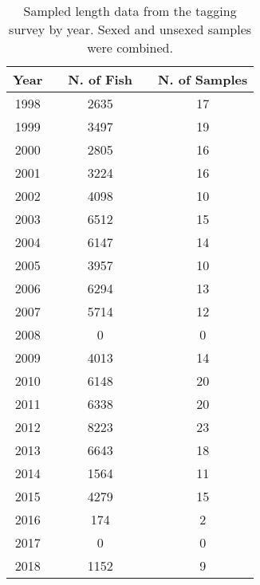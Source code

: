 \begingroup\fontsize{10}{12}\selectfont
\begingroup\fontsize{10}{12}\selectfont


\begin{table}[]
\caption{Sampled length data from the tagging survey by year. Sexed and unsexed samples were combined.}
\label{tab:survey_sample_indices}
\begin{tabular}{ccccc}
\hline
\multicolumn{1}{l}{Year} & \multicolumn{1}{l}{} & \multicolumn{1}{l}{N. of Fish} & \multicolumn{1}{l}{} & \multicolumn{1}{l}{N. of Samples} \\ \hline
1998 &  & 2635 &  & 17 \\
1999 &  & 3497 &  & 19 \\
2000 &  & 2805 &  & 16 \\
2001 &  & 3224 &  & 16 \\
2002 &  & 4098 &  & 10 \\
2003 &  & 6512 &  & 15 \\
2004 &  & 6147 &  & 14 \\
2005 &  & 3957 &  & 10 \\
2006 &  & 6294 &  & 13 \\
2007 &  & 5714 &  & 12 \\
2008 &  & 0 &  & 0 \\
2009 &  & 4013 &  & 14 \\
2010 &  & 6148 &  & 20 \\
2011 &  & 6338 &  & 20 \\
2012 &  & 8223 &  & 23 \\
2013 &  & 6643 &  & 18 \\
2014 &  & 1564 &  & 11 \\
2015 &  & 4279 &  & 15 \\
2016 &  & 174 &  & 2 \\
2017 &  & 0 &  & 0 \\
2018 &  & 1152 &  & 9 \\ \hline
\end{tabular}
\end{table}
\endgroup{}
\endgroup{}
